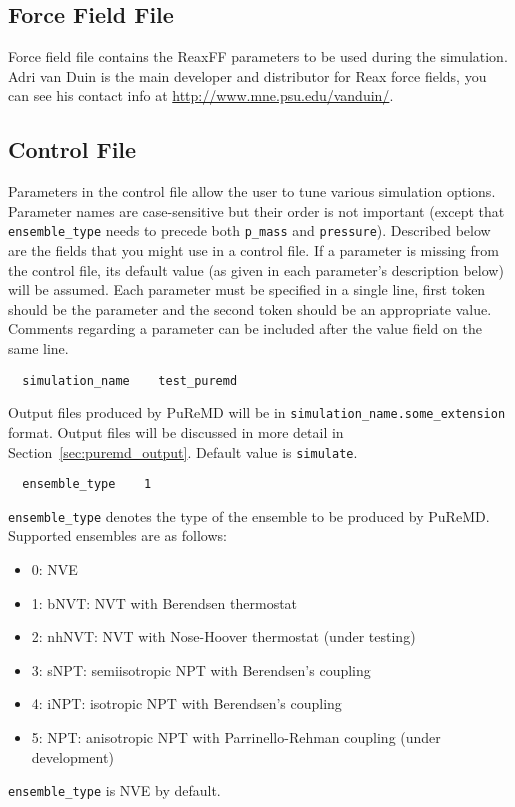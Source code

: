 \documentclass{article}
\begin{document}
\subsection{Force Field File}
\label{sec:puremd_ffield}

Force field file contains the ReaxFF parameters to be used during 
the simulation. Adri van Duin is the main developer and distributor 
for Reax force fields, you can see his contact info at 
\url{http://www.mne.psu.edu/vanduin/}.

\subsection{Control File} 
\label{sec:puremd_control}

Parameters in the control file allow the user to tune various simulation 
options. Parameter names are case-sensitive but their order is not important 
(except that {\tt ensemble\_type} needs to precede both {\tt p\_mass} and 
{\tt pressure}). Described below are the fields that you might use in a 
control file. If a parameter is missing from the control file, its default 
value (as given in each parameter's description below) will be assumed.
Each parameter must be specified in a single line, first token should be
the parameter and the second token should be an appropriate value. 
Comments regarding a parameter can be included after the value field 
on the same line.

\begin{verbatim}
  simulation_name    test_puremd
\end{verbatim}
Output files produced by PuReMD will be in 
{\tt simulation\_name.some\_extension} format. Output files will be 
discussed in more detail in Section~\ref{sec:puremd_output}. Default value 
is {\tt simulate}.

\begin{verbatim}
  ensemble_type    1
\end{verbatim}
{\tt ensemble\_type} denotes the type of the ensemble to be produced by 
PuReMD. Supported ensembles are as follows:
\begin{itemize}
  \item 0: NVE
  \item 1: bNVT: NVT with Berendsen thermostat
  \item 2: nhNVT: NVT with Nose-Hoover thermostat (under testing)
  \item 3: sNPT: semiisotropic NPT with Berendsen's coupling
  \item 4: iNPT: isotropic NPT with Berendsen's coupling
  \item 5: NPT: anisotropic NPT with Parrinello-Rehman coupling 
    (under development)
\end{itemize}
{\tt ensemble\_type} is NVE by default.
\end{document}

